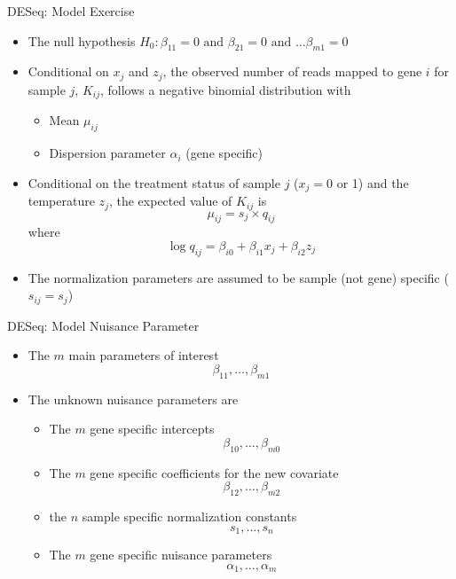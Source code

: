 \documentclass[xcolor=x11names,compress]{beamer}\usepackage[]{graphicx}\usepackage[]{color}
\begin{document}
\begin{frame}{DESeq: Model Exercise}
  \begin{itemize}
  \item The null hypothesis $H_0: \beta_{11}=0 \mbox{ and } \beta_{21}=0 \mbox{ and } \ldots \beta_{m1}=0$
   \item Conditional on $x_j$ and $z_j$, the observed number of reads mapped to gene $i$ for sample $j$, $K_{ij}$, follows a 
     negative binomial distribution with
    \begin{itemize}
    \item Mean $\mu_{ij}$ 
    \item Dispersion parameter $\alpha_i$ (gene specific)
    \end{itemize}
  \item Conditional on the treatment status of sample $j$ ($x_j=0$ or 1) and the temperature $z_j$, 
    the expected value of $K_{ij}$ is
    \begin{equation*}
      \mu_{ij} = s_{j} \times q_{ij}
    \end{equation*}
  where
    \begin{equation*}
     \log q_{ij} =\beta_{i0} + \beta_{i1} x_j + \beta_{i2} z_j
    \end{equation*}
    \item The normalization parameters are assumed to be sample (not gene) specific ($s_{ij}=s_j$)
  \end{itemize}
\end{frame}

\begin{frame}{DESeq: Model Nuisance Parameter}
   \begin{itemize}
    \item The $m$ main parameters of interest
      \begin{equation*}
        \beta_{11},\ldots,\beta_{m1}
      \end{equation*}
  \item The unknown nuisance parameters are
    \begin{itemize}
      \item The $m$ gene specific intercepts
        \begin{equation*}
          \beta_{10},\ldots,\beta_{m0}
        \end{equation*}
         \item The $m$ gene specific coefficients for the new covariate
        \begin{equation*}
          \beta_{12},\ldots,\beta_{m2}
        \end{equation*}
      \item the $n$ sample specific normalization constants
        \begin{equation*}
          s_1,\ldots,s_n
        \end{equation*}
      \item The $m$ gene specific nuisance parameters
         \begin{equation*}
          \alpha_{1},\ldots,\alpha_{m}
        \end{equation*}
       \end{itemize}
  \end{itemize}
\end{frame}
\end{document}
